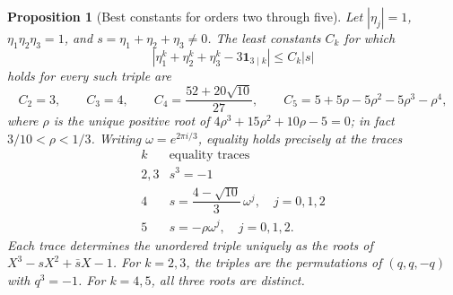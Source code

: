\documentclass[UTF8,11pt]{ctexart}
\newtheorem{prop}[thm]{Proposition}
\theoremstyle{definition}
\numberwithin{equation}{section}
\begin{document}
\begin{prop}[Best constants for orders two through five]
\label{v20:prop:powers}
Let $|\eta_j|=1$, $\eta_1\eta_2\eta_3=1$, and
$s=\eta_1+\eta_2+\eta_3\ne0$. The least constants $C_k$ for which
\[
 \left|\eta_1^k+\eta_2^k+\eta_3^k-3\mathbf1_{3\mid k}\right|
 \le C_k|s|
\]
holds for every such triple are
\begin{equation}\label{v20:eq:constants}
 C_2=3,\qquad C_3=4,\qquad
 C_4=\frac{52+20\sqrt{10}}{27},\qquad
 C_5=5+5\rho-5\rho^2-5\rho^3-\rho^4,
\end{equation}
where $\rho$ is the unique positive root of
$4\rho^3+15\rho^2+10\rho-5=0$; in fact $3/10<\rho<1/3$.
Writing $\omega=e^{2\pi i/3}$, equality holds precisely at the traces
\[
 \begin{array}{c|c}
 k&\text{equality traces}\\ \hline
 2,3&s^3=-1\\[2pt]
 4&s=\dfrac{4-\sqrt{10}}3\,\omega^j,\quad j=0,1,2\\[5pt]
 5&s=-\rho\omega^j,\quad j=0,1,2.
 \end{array}
\]
Each trace determines the unordered triple uniquely as the roots of
$X^3-sX^2+\bar sX-1$. For $k=2,3$, the triples are the permutations
of $(q,q,-q)$ with $q^3=-1$. For $k=4,5$, all three roots are distinct.
\end{prop}
\end{document}
